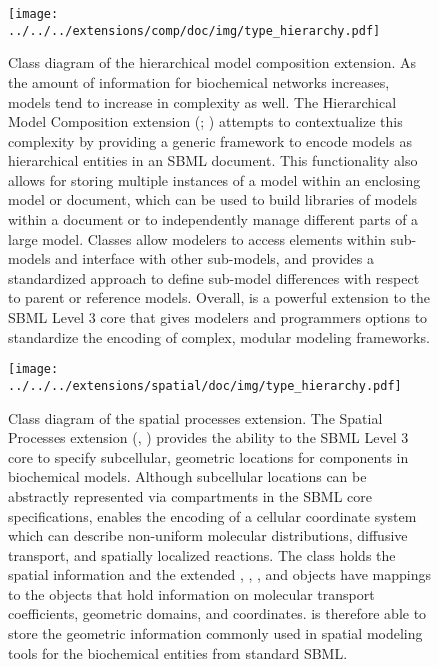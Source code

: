 \begin{figure}[H]
 \centering
\texttt{[image: ../../../extensions/comp/doc/img/type\_hierarchy.pdf]}
 \vspace*{-5em}
 \caption[Class diagram of the hierarchical model composition extension]{Class diagram of the hierarchical model composition extension. As the amount of information for biochemical networks increases, models tend to
increase in complexity as well. The Hierarchical Model Composition extension (; \cite{smith2010})
attempts to contextualize this complexity by providing a generic framework to encode
models as hierarchical entities in an SBML document. This functionality also allows
for storing multiple instances of a model within an enclosing model or document, which
can be used to build libraries of models within a document or to independently manage
different parts of a large model. Classes allow modelers to access elements within
sub-models and interface with other sub-models, and  provides a standardized approach
to define sub-model differences with respect to parent or reference models. Overall, 
is a powerful extension to the SBML Level 3 core that gives modelers and programmers
options to standardize the encoding of complex, modular modeling frameworks. 
}
 \label{fig:comp}
\end{figure}


\begin{figure}[H]
 \centering
\texttt{[image: ../../../extensions/spatial/doc/img/type\_hierarchy.pdf]}
 \vspace*{-2.5em}
 \caption[Class diagram of the spatial processes extension]{Class diagram of the spatial processes extension. The Spatial Processes extension (, \cite{Schaff2014})
provides the ability to the SBML Level 3 core to specify subcellular,
geometric locations for components in biochemical
models. Although subcellular locations can be abstractly represented via
compartments in the SBML core specifications,  enables the encoding of
a cellular coordinate system which can describe non-uniform molecular distributions,
diffusive transport, and spatially localized reactions. The  class holds
the spatial information and the extended , , , and
 objects have mappings to the  objects that hold information on
molecular transport coefficients, geometric domains, and coordinates.  is
therefore able to store the geometric information commonly used in spatial modeling
tools for the biochemical entities from standard SBML.}
 \label{fig:spatial}
\end{figure}


